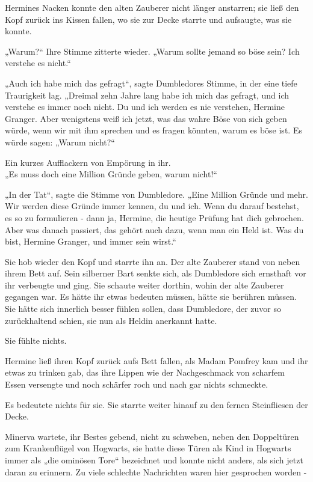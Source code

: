 {Hermines Nacken konnte den alten Zauberer nicht länger anstarren; sie ließ den Kopf zurück ins Kissen fallen, wo sie zur Decke starrte und aufsaugte, was sie konnte.

„Warum?“ Ihre Stimme zitterte wieder. „Warum sollte jemand so böse sein? Ich verstehe es nicht.“

„Auch ich habe mich das gefragt“, sagte Dumbledores Stimme, in der eine tiefe Traurigkeit lag. „Dreimal zehn Jahre lang habe ich mich das gefragt, und ich verstehe es immer noch nicht. Du und ich werden es nie verstehen, Hermine Granger. Aber wenigstens weiß ich jetzt, was das wahre Böse von sich geben würde, wenn wir mit ihm sprechen und es fragen könnten, warum es böse ist. Es würde sagen: „Warum nicht?“

Ein kurzes Aufflackern von Empörung in ihr.\\ „Es muss doch eine Million Gründe geben, warum nicht!“

„In der Tat“, sagte die Stimme von Dumbledore. „Eine Million Gründe und mehr. Wir werden diese Gründe immer kennen, du und ich. Wenn du darauf bestehst, es so zu formulieren - dann ja, Hermine, die heutige Prüfung hat dich gebrochen. Aber was danach passiert, das gehört auch dazu, wenn man ein Held ist. Was du bist, Hermine Granger, und immer sein wirst.“

Sie hob wieder den Kopf und starrte ihn an. Der alte Zauberer stand von neben ihrem Bett auf. Sein silberner Bart senkte sich, als Dumbledore sich ernsthaft vor ihr verbeugte und ging. Sie schaute weiter dorthin, wohin der alte Zauberer gegangen war. Es hätte ihr etwas bedeuten müssen, hätte sie berühren müssen. Sie hätte sich innerlich besser fühlen sollen, dass Dumbledore, der zuvor so zurückhaltend schien, sie nun als Heldin anerkannt hatte.

Sie fühlte nichts.

Hermine ließ ihren Kopf zurück aufs Bett fallen, als Madam Pomfrey kam und ihr etwas zu trinken gab, das ihre Lippen wie der Nachgeschmack von scharfem Essen versengte und noch schärfer roch und nach gar nichts schmeckte.

Es bedeutete nichts für sie. Sie starrte weiter hinauf zu den fernen Steinfliesen der Decke.

Minerva wartete, ihr Bestes gebend, nicht zu schweben, neben den Doppeltüren zum Krankenflügel von Hogwarts, sie hatte diese Türen als Kind in Hogwarts immer als „die ominösen Tore“ bezeichnet und konnte nicht anders, als sich jetzt daran zu erinnern. Zu viele schlechte Nachrichten waren hier gesprochen worden -

}
